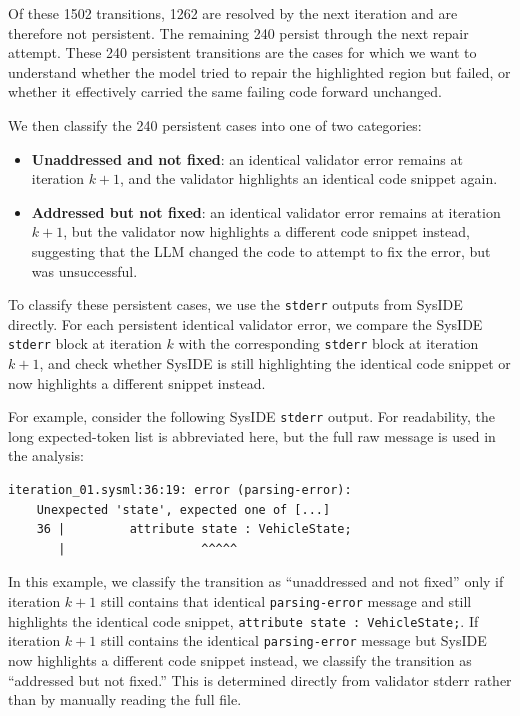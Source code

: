 \documentclass[11pt]{article}
\begin{document}
Of these 1502 transitions, 1262 are resolved by the next iteration and are therefore not persistent. The remaining 240 persist through the next repair attempt. These 240 persistent transitions are the cases for which we want to understand whether the model tried to repair the highlighted region but failed, or whether it effectively carried the same failing code forward unchanged.

We then classify the 240 persistent cases into one of two categories:
\begin{itemize}
    \item \textbf{Unaddressed and not fixed}: an identical validator error remains at iteration \(k+1\), and the validator highlights an identical code snippet again.
    \item \textbf{Addressed but not fixed}: an identical validator error remains at iteration \(k+1\), but the validator now highlights a different code snippet instead, suggesting that the LLM changed the code to attempt to fix the error, but was unsuccessful.
\end{itemize}

To classify these persistent cases, we use the \texttt{stderr} outputs from SysIDE directly. For each persistent identical validator error, we compare the SysIDE \texttt{stderr} block at iteration \(k\) with the corresponding \texttt{stderr} block at iteration \(k+1\), and check whether SysIDE is still highlighting the identical code snippet or now highlights a different snippet instead.

For example, consider the following SysIDE \texttt{stderr} output. For readability, the long expected-token list is abbreviated here, but the full raw message is used in the analysis:
\begin{lstlisting}
iteration_01.sysml:36:19: error (parsing-error):
    Unexpected 'state', expected one of [...]
    36 |         attribute state : VehicleState;
       |                   ^^^^^
\end{lstlisting}
In this example, we classify the transition as ``unaddressed and not fixed'' only if iteration \(k+1\) still contains that identical \texttt{parsing-error} message and still highlights the identical code snippet, \texttt{attribute state : VehicleState;}. If iteration \(k+1\) still contains the identical \texttt{parsing-error} message but SysIDE now highlights a different code snippet instead, we classify the transition as ``addressed but not fixed.'' This is determined directly from validator stderr rather than by manually reading the full file.
\end{document}

